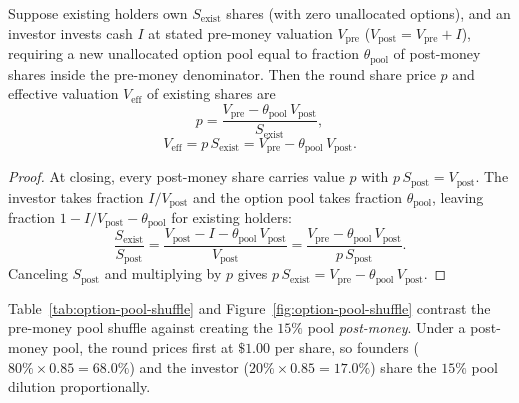 \begin{proposition}
\label{prop:option-pool-shuffle}
Suppose existing holders own $S_{\text{exist}}$ shares (with zero unallocated options), and an investor invests cash $I$ at stated pre-money valuation $V_{\text{pre}}$ ($V_{\text{post}} = V_{\text{pre}} + I$), requiring a new unallocated option pool equal to fraction $\theta_{\text{pool}}$ of post-money shares inside the pre-money denominator. Then the round share price $p$ and effective valuation $V_{\text{eff}}$ of existing shares are
\begin{equation}\label{eq:effective-pps}
  p = \frac{V_{\text{pre}} - \theta_{\text{pool}}\,V_{\text{post}}}{S_{\text{exist}}},
\end{equation}
\begin{equation}\label{eq:effective-pre-money}
  V_{\text{eff}} = p\,S_{\text{exist}} = V_{\text{pre}} - \theta_{\text{pool}}\,V_{\text{post}}.
\end{equation}
\end{proposition}

\begin{proof}
At closing, every post-money share carries value $p$ with $p\,S_{\text{post}} = V_{\text{post}}$. The investor takes fraction $I / V_{\text{post}}$ and the option pool takes fraction $\theta_{\text{pool}}$, leaving fraction $1 - I/V_{\text{post}} - \theta_{\text{pool}}$ for existing holders:
\[
  \frac{S_{\text{exist}}}{S_{\text{post}}} = \frac{V_{\text{post}} - I - \theta_{\text{pool}}\,V_{\text{post}}}{V_{\text{post}}} = \frac{V_{\text{pre}} - \theta_{\text{pool}}\,V_{\text{post}}}{p\,S_{\text{post}}}.
\]
Canceling $S_{\text{post}}$ and multiplying by $p$ gives $p\,S_{\text{exist}} = V_{\text{pre}} - \theta_{\text{pool}}\,V_{\text{post}}$.
\end{proof}

Table~\ref{tab:option-pool-shuffle} and Figure~\ref{fig:option-pool-shuffle} contrast the pre-money pool shuffle against creating the $15\%$ pool \emph{post-money}. Under a post-money pool, the round prices first at $\$1.00$ per share, so founders ($80\% \times 0.85 = 68.0\%$) and the investor ($20\% \times 0.85 = 17.0\%$) share the $15\%$ pool dilution proportionally.

